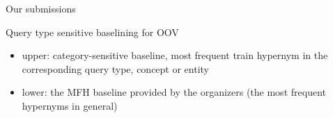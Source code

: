 \documentclass{beamer}
\newlength{\onecolwid}
\begin{document}
\begin{frame}[t]
\begin{columns}[t]
\begin{column}{\onecolwid}
\begin{block}{Our submissions}

  \end{block}



\begin{block}{Query type sensitive baselining for OOV}

  

  \begin{itemize}
    \item \alert{upper:} category-sensitive baseline, most frequent train
      hypernym in the corresponding query type, concept or entity
    \item \alert{lower:} the MFH baseline provided by the organizers (the
      most frequent hypernyms in general)
  \end{itemize}
\end{block}

\end{column} 



\end{columns}
\end{frame}
\end{document}
